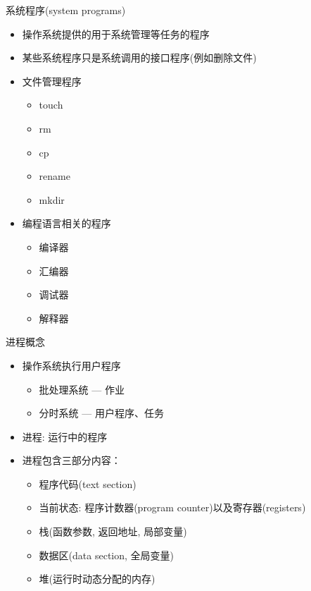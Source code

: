 \documentclass[xcolor=svgnames]{beamer}
\begin{document}
\begin{CJK*}{UTF8}{gbsn}
\begin{frame}{系统程序(system programs)}
\begin{itemize}
\item 操作系统提供的用于系统管理等任务的程序
\item 某些系统程序只是系统调用的接口程序(例如删除文件)
\item 文件管理程序
\begin{itemize}
\item touch
\item rm
\item cp
\item rename
\item mkdir
\end{itemize}
\item 编程语言相关的程序
\begin{itemize}
\item 编译器
\item 汇编器
\item 调试器
\item 解释器
\end{itemize}
\end{itemize}
\end{frame}

\begin{frame}{进程概念}
\begin{itemize}
\item 操作系统执行用户程序
\begin{itemize}
\item 批处理系统 --- 作业
\item 分时系统 --- 用户程序、任务
\end{itemize}
\item 进程: 运行中的程序 
\item 进程包含三部分内容：
\begin{itemize}
\item 程序代码(text section)
\item 当前状态: 程序计数器(program counter)以及寄存器(registers)
\item 栈(函数参数, 返回地址, 局部变量)
\item 数据区(data section, 全局变量)
\item 堆(运行时动态分配的内存)
\end{itemize}
\end{itemize}
\end{frame}



\end{CJK*}
\end{document}

